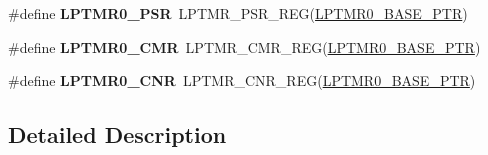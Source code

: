 \begin{DoxyCompactItemize}
\item 
\hypertarget{group___l_p_t_m_r___register___accessor___macros_ga69b40af8e215d5b29b3f9677d7f8d632}{}\#define {\bfseries L\+P\+T\+M\+R0\+\_\+\+P\+S\+R}~L\+P\+T\+M\+R\+\_\+\+P\+S\+R\+\_\+\+R\+E\+G(\hyperlink{group___l_p_t_m_r___peripheral_ga90a9194151ad11b422bcab162e797eda}{L\+P\+T\+M\+R0\+\_\+\+B\+A\+S\+E\+\_\+\+P\+T\+R})\label{group___l_p_t_m_r___register___accessor___macros_ga69b40af8e215d5b29b3f9677d7f8d632}

\item 
\hypertarget{group___l_p_t_m_r___register___accessor___macros_gac109508795b1b22820940313ddb4c620}{}\#define {\bfseries L\+P\+T\+M\+R0\+\_\+\+C\+M\+R}~L\+P\+T\+M\+R\+\_\+\+C\+M\+R\+\_\+\+R\+E\+G(\hyperlink{group___l_p_t_m_r___peripheral_ga90a9194151ad11b422bcab162e797eda}{L\+P\+T\+M\+R0\+\_\+\+B\+A\+S\+E\+\_\+\+P\+T\+R})\label{group___l_p_t_m_r___register___accessor___macros_gac109508795b1b22820940313ddb4c620}

\item 
\hypertarget{group___l_p_t_m_r___register___accessor___macros_gada9bf6b3d564321571ac27faa4d263ad}{}\#define {\bfseries L\+P\+T\+M\+R0\+\_\+\+C\+N\+R}~L\+P\+T\+M\+R\+\_\+\+C\+N\+R\+\_\+\+R\+E\+G(\hyperlink{group___l_p_t_m_r___peripheral_ga90a9194151ad11b422bcab162e797eda}{L\+P\+T\+M\+R0\+\_\+\+B\+A\+S\+E\+\_\+\+P\+T\+R})\label{group___l_p_t_m_r___register___accessor___macros_gada9bf6b3d564321571ac27faa4d263ad}

\end{DoxyCompactItemize}


\subsection{Detailed Description}
